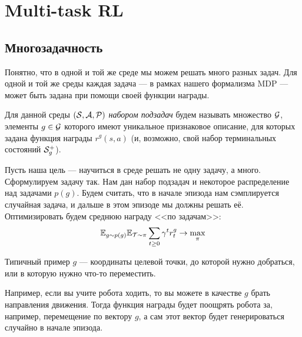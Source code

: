 \section{Multi-task RL}

\subsection{Многозадачность}

Понятно, что в одной и той же среде мы можем решать много разных задач. Для одной и той же среды каждая задача --- в рамках нашего формализма MDP --- может быть задана при помощи своей функции награды.

\begin{definition}
Для данной среды $(\mathcal{S}, \mathcal{A}, \mathcal{P})$ \emph{набором подзадач} будем называть множество $\mathcal{G}$, элементы $g \in \mathcal{G}$ которого имеют уникальное признаковое описание, для которых задана функция награды $r^g(s, a)$ (и, возможно, свой набор терминальных состояний $\mathcal{S}^+_g$).
\end{definition}

Пусть наша цель --- научиться в среде решать не одну задачу, а много. Сформулируем задачу так. Нам дан набор подзадач и некоторое распределение над задачами $p(g)$. Будем считать, что в начале эпизода нам сэмплируется случайная задача, и дальше в этом эпизоде мы должны решать её. Оптимизировать будем среднюю награду <<по задачам>>:
\begin{equation}\label{multitask}
\mathbb{E}_{g \sim p(g)} \mathbb{E}_{\mathcal{T} \sim \pi} \sum_{t \ge 0}\gamma^t r^g_t \to \max_{\pi}
\end{equation}

\begin{example}
Типичный пример $g$ --- координаты целевой точки, до которой нужно добраться, или в которую нужно что-то переместить.
\end{example}

\begin{example}
Например, если вы учите робота ходить, то вы можете в качестве $g$ брать направления движения. Тогда функция награды будет поощрять робота за, например, перемещение по вектору $g$, а сам этот вектор будет генерироваться случайно в начале эпизода.
\end{example}

